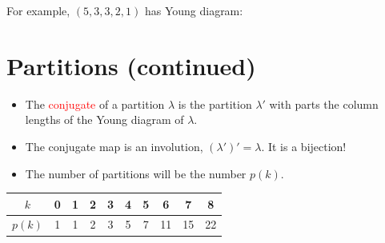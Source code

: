 \documentclass[12pt]{memoir}
\begin{document}
For example, $(5,3,3,2,1)$ has Young diagram:
\begin{center}
\end{center}

\newpage

\section{Partitions (continued)}

\begin{itemize}[label=$\diamond$]
    \item The \textcolor{red}{conjugate} of a partition $\lambda$ is the partition $\lambda'$ with parts the column lengths of the Young diagram of $\lambda$.
\end{itemize}

\begin{center}
\end{center}

\begin{itemize}[label=$\diamond$]
    \item The conjugate map is an involution, $(\lambda')' = \lambda$. It is a bijection!
    \item The number of partitions will be the number $p(k)$.
\end{itemize}

\begin{center}
\begin{tabular}{c|ccccccccc}
$k$ & 0 & 1 & 2 & 3 & 4 & 5 & 6 & 7 & 8 \\
\hline
$p(k)$ & 1 & 1 & 2 & 3 & 5 & 7 & 11 & 15 & 22
\end{tabular}
\end{center}
\end{document}
